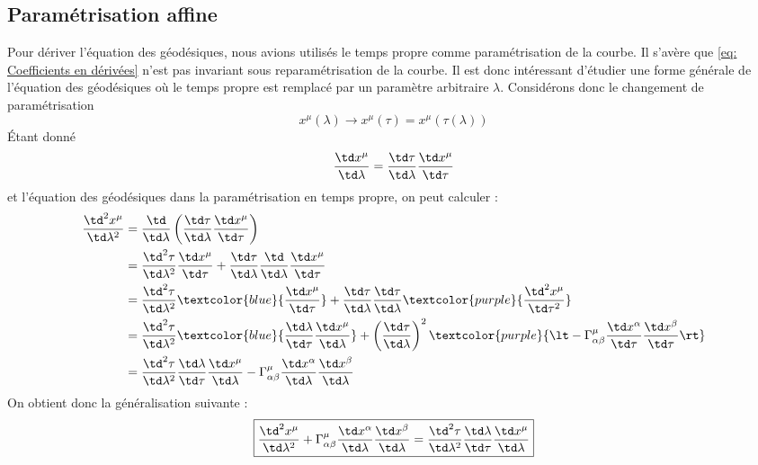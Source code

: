 \subsection{Paramétrisation affine}
Pour dériver l'équation des géodésiques, nous avions utilisés le temps propre comme paramétrisation de la courbe. Il s'avère que \ref{eq: Coefficients en dérivées} n'est pas invariant sous reparamétrisation de la courbe. Il est donc intéressant d'étudier une forme générale de l'équation des géodésiques où le temps propre est remplacé par un paramètre arbitraire $\lambda$. Considérons donc le changement de paramétrisation
\begin{equation*}
    x^\mu (\lambda) \to x^\mu(\tau) = x^\mu(\tau(\lambda))
\end{equation*}
Étant donné
\begin{equation}
    \frac{\td x^{\mu}}{\td \lambda} = \frac{\td \tau}{\td \lambda}\frac{\td  x^{\mu}}{\td \tau}
\end{equation}
et l'équation des géodésiques dans la paramétrisation en temps propre, on peut calculer :
\begin{align}
    \frac{\td ^2 x^{\mu}}{\td \lambda ^2} &= \frac{\td }{\td \lambda}\left(\frac{\td \tau}{\td \lambda}\frac{\td  x^{\mu}}{\td \tau}\right)\\
    & = \frac{\td ^2 \tau}{\td \lambda ^2}\frac{\td  x^{\mu}}{\td \tau} +  \frac{\td \tau}{\td \lambda} \frac{\td }{\td \lambda}\frac{\td  x^{\mu}}{\td \tau }\\
    &=\frac{\td ^2 \tau}{\td \lambda ^2}\textcolor{blue}{\frac{\td  x^{\mu}}{\td \tau}} +  \frac{\td \tau}{\td \lambda} \frac{\td \tau}{\td \lambda}\textcolor{purple}{\frac{\td ^2 x^{\mu}}{\td \tau ^2}}\\
    &= \frac{\td ^2 \tau}{\td \lambda ^2}\textcolor{blue}{\frac{\td \lambda}{\td \tau}\frac{\td  x^{\mu}}{\td \lambda}} + \left(\frac{\td \tau}{\td \lambda}\right)^2\textcolor{purple}{\lt-\Gamma^{\mu}_{\alpha \beta}\frac{\td  x^{\alpha}}{\td \tau}\frac{\td  x^{\beta}}{\td \tau} \rt}\\
    &= \frac{\td ^2 \tau}{\td \lambda ^2}\frac{\td \lambda}{\td \tau}\frac{\td  x^{\mu}}{\td \lambda} - \Gamma^{\mu}_{\alpha \beta}\frac{\td  x^{\alpha}}{\td \lambda}\frac{\td  x^{\beta}}{\td \lambda}
\end{align}
On obtient donc la généralisation suivante :
\begin{align}
     \boxed{\frac{\td ^2 x^{\mu}}{\td \lambda ^2} + \Gamma^{\mu}_{\alpha \beta}\frac{\td  x^{\alpha}}{\td \lambda}\frac{\td  x^{\beta}}{\td \lambda} = \frac{\td ^2 \tau}{\td \lambda ^2}\frac{\td \lambda}{\td \tau}\frac{\td  x^{\mu}}{\td \lambda}}
     \label{eq:pour expliquer Morera v2}
\end{align}
